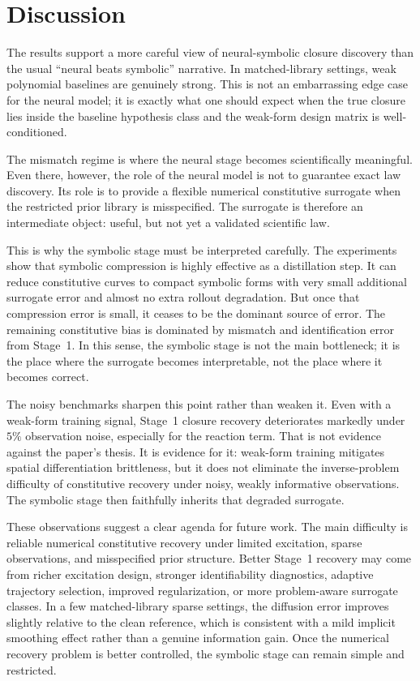 \section{Discussion}

The results support a more careful view of neural-symbolic closure discovery than the usual ``neural beats symbolic'' narrative. In matched-library settings, weak polynomial baselines are genuinely strong. This is not an embarrassing edge case for the neural model; it is exactly what one should expect when the true closure lies inside the baseline hypothesis class and the weak-form design matrix is well-conditioned.

The mismatch regime is where the neural stage becomes scientifically meaningful. Even there, however, the role of the neural model is not to guarantee exact law discovery. Its role is to provide a flexible numerical constitutive surrogate when the restricted prior library is misspecified. The surrogate is therefore an intermediate object: useful, but not yet a validated scientific law.

This is why the symbolic stage must be interpreted carefully. The experiments show that symbolic compression is highly effective as a distillation step. It can reduce constitutive curves to compact symbolic forms with very small additional surrogate error and almost no extra rollout degradation. But once that compression error is small, it ceases to be the dominant source of error. The remaining constitutive bias is dominated by mismatch and identification error from Stage~1. In this sense, the symbolic stage is not the main bottleneck; it is the place where the surrogate becomes interpretable, not the place where it becomes correct.

The noisy benchmarks sharpen this point rather than weaken it. Even with a weak-form training signal, Stage~1 closure recovery deteriorates markedly under $5\%$ observation noise, especially for the reaction term. That is not evidence against the paper's thesis. It is evidence for it: weak-form training mitigates spatial differentiation brittleness, but it does not eliminate the inverse-problem difficulty of constitutive recovery under noisy, weakly informative observations. The symbolic stage then faithfully inherits that degraded surrogate.

These observations suggest a clear agenda for future work. The main difficulty is reliable numerical constitutive recovery under limited excitation, sparse observations, and misspecified prior structure. Better Stage~1 recovery may come from richer excitation design, stronger identifiability diagnostics, adaptive trajectory selection, improved regularization, or more problem-aware surrogate classes. In a few matched-library sparse settings, the diffusion error improves slightly relative to the clean reference, which is consistent with a mild implicit smoothing effect rather than a genuine information gain. Once the numerical recovery problem is better controlled, the symbolic stage can remain simple and restricted.

